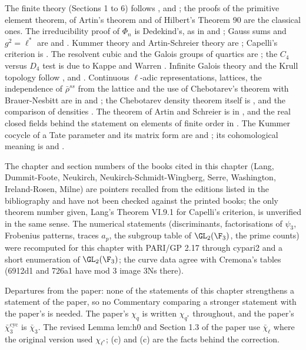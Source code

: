 The finite theory (Sections 1 to 6) follows \cite[Chapters V and VI]{Lang}, \cite[Chapters 13 and 14]{DummitFoote} and \cite{MilneFields}; the proofs of the primitive
element theorem, of Artin's theorem and of Hilbert's Theorem 90 are the classical ones. The irreducibility proof of $\Phi_n$ is Dedekind's, as in \cite[Chapter VI,
Section 3]{Lang} and \cite[Chapter 2]{Washington}; Gauss sums and $g^2=\ell^*$ are  and \cite[Chapter 6]{IrelandRosen}. Kummer theory and Artin-Schreier theory
are \cite[Chapter VI, Sections 6 and 8]{Lang}; Capelli's criterion is \cite[Chapter VI, Section 9]{Lang}. The resolvent cubic and the Galois groups of quartics are
\cite[Section 14.6]{DummitFoote}; the $C_4$ versus $D_4$ test is due to Kappe and Warren \cite{KappeWarren89}. Infinite Galois theory and the Krull topology follow
\cite[Chapter IV, Section 1]{Neukirch}, \cite[Chapter I, Section 1]{NSW} and \cite[Chapter 7]{MilneFields}. Continuous $\ell$-adic representations, lattices, the
independence of $\bar\rho^{ss}$ from the lattice and the use of Chebotarev's theorem with Brauer-Nesbitt are in \cite[Chapter I]{SerreAbelian} and \cite[Section 1]{DDT}; the
Chebotarev density theorem itself is \cite[Chapter VII, Section 13]{Neukirch}, and the comparison of densities \cite[Chapter VI, Section 4]{SerreCourse}. The theorem of
Artin and Schreier is in \cite[Chapter VI, Section 9]{Lang}, and the real closed fields behind the statement on elements of finite order in \cite[Chapter XI]{Lang}. The Kummer cocycle of a Tate parameter and its matrix form are \cite[Chapter IV]{SerreAbelian}
and ; its cohomological meaning is \cite[Chapter VI]{NSW} and .

The chapter and section numbers of the books cited in this chapter (Lang, Dummit-Foote, Neukirch, Neukirch-Schmidt-Wingberg, Serre, Washington, Ireland-Rosen,
Milne) are pointers recalled from the editions listed in the bibliography and have not been checked against the printed books; the only theorem number given,
Lang's Theorem VI.9.1 for Capelli's criterion, is unverified in the same sense. The numerical statements (discriminants, factorisations of $\psi_3$, Frobenius patterns,
traces $a_p$, the subgroup table of $\GL_2(\F_3)$, the prime counts) were recomputed for this chapter with PARI/GP 2.17 through cypari2 and a short enumeration of
$\GL_2(\F_3)$; the curve data agree with Cremona's tables (6912d1 and 726a1 have mod $3$ image 3Ns there).

Departures from the paper: none of the statements of this chapter strengthens a statement of the paper, so no Commentary comparing a stronger statement with the paper's is needed. The
paper's $\chi_q$ is written $\chi_{q^*}$ throughout, and the paper's $\bar\chi_3^{\mathrm{cyc}}$ is $\bar\chi_3$. The revised Lemma lem:h0 and Section 1.3 of the paper use
$\bar\chi_\ell$ where the original version used $\chi_{\ell^*}$; (c) and (c) are the facts behind the correction.
